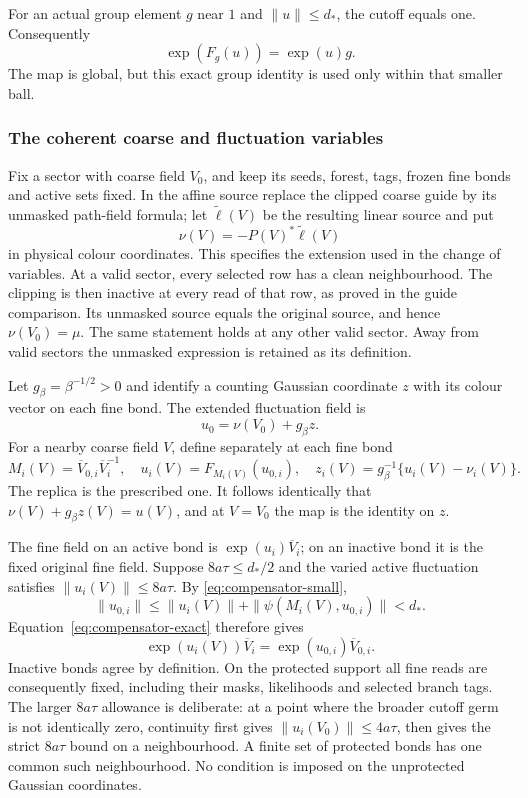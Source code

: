 For an actual group element $g$ near $1$ and $\|u\|\le d_*$, the
cutoff equals one. Consequently
\begin{equation}\label{eq:compensator-exact}
 \exp(F_g(u))=\exp(u)g.
\end{equation}
The map is global, but this exact group identity is used only within
that smaller ball.

\subsubsection{The coherent coarse and fluctuation variables}
Fix a sector with coarse field $V_0$, and keep its seeds, forest,
tags, frozen fine bonds and active sets fixed. In the affine source
replace the clipped coarse guide by its unmasked path-field formula;
let $\widetilde\ell(V)$ be the resulting linear source and put
\[
 \nu(V)=-P(V)^*\widetilde\ell(V)
\]
in physical colour coordinates. This specifies the extension used
in the change of variables. At a valid sector, every selected row
has a clean neighbourhood. The clipping is then inactive at every
read of that row, as proved in the guide comparison. Its unmasked
source equals the original source, and hence $\nu(V_0)=\mu$.
The same statement holds at any other valid sector. Away from valid
sectors the unmasked expression is retained as its definition.

Let $g_\beta=\beta^{-1/2}>0$ and identify a counting Gaussian
coordinate $z$ with its colour vector on each fine bond. The extended
fluctuation field is
\[
 u_0=\nu(V_0)+g_\beta z.
\]
For a nearby coarse field $V$, define separately at each fine bond
\begin{equation}\label{eq:compensator-course}
 M_i(V)=\overline V_{0,i}\overline V_i^{-1},\quad
 u_i(V)=F_{M_i(V)}(u_{0,i}),\quad
 z_i(V)=g_\beta^{-1}\{u_i(V)-\nu_i(V)\}.
\end{equation}
The replica is the prescribed one. It follows identically that
$\nu(V)+g_\beta z(V)=u(V)$, and at $V=V_0$ the map is the identity
on $z$.

The fine field on an active bond is $\exp(u_i)\overline V_i$;
on an inactive bond it is the fixed original fine field. Suppose
$8a\tau\le d_*/2$ and the varied active fluctuation satisfies
$\|u_i(V)\|\le8a\tau$. By \eqref{eq:compensator-small},
\[
 \|u_{0,i}\|\le\|u_i(V)\|+\|\psi(M_i(V),u_{0,i})\|<d_*.
\]
Equation~\eqref{eq:compensator-exact} therefore gives
\begin{equation}\label{eq:compensator-held-fine}
 \exp(u_i(V))\overline V_i
 =\exp(u_{0,i})\overline V_{0,i}.
\end{equation}
Inactive bonds agree by definition. On the protected support all fine
reads are consequently fixed, including their masks, likelihoods and
selected branch tags. The larger $8a\tau$ allowance is deliberate: at
a point where the broader cutoff germ is not identically zero,
continuity first gives $\|u_i(V_0)\|\le4a\tau$, then gives the strict
$8a\tau$ bound on a neighbourhood. A finite set of protected bonds has
one common such neighbourhood. No condition is imposed on the
unprotected Gaussian coordinates.

